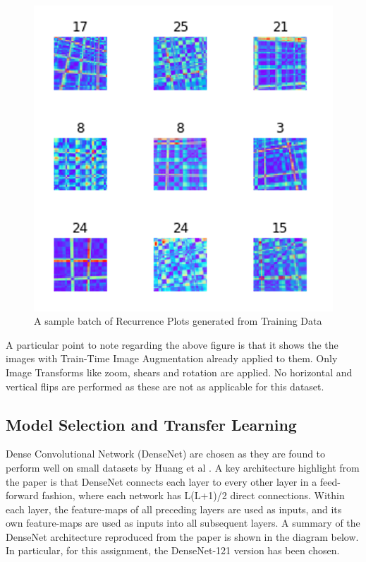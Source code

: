 \documentclass[conference]{IEEEtran}
\begin{document}
\begin{figure}[H]
\begin{center}
\includegraphics[scale=1]{Image/recurrence_plot_augmented.png}
\caption{\label{recurrence_plot_augmented} A sample batch of Recurrence Plots generated from Training Data}
\end{center}
\end{figure}

A particular point to note regarding the above figure is that it shows the the images with Train-Time Image Augmentation already applied to them. Only Image Transforms like zoom, shears and rotation are applied. No horizontal and vertical flips are performed as these are not as applicable for this dataset.

\subsection{Model Selection and Transfer Learning}
Dense Convolutional Network (DenseNet) are chosen as they are found to perform well on small datasets by Huang et al \cite{huang2016densely}. A key architecture highlight from the paper is that DenseNet connects each layer to every other layer in a feed-forward fashion, where each network has L(L+1)/2 direct connections. Within each layer, the feature-maps of all preceding layers are used as inputs, and its own feature-maps are used as inputs into all subsequent layers. A summary of the DenseNet architecture reproduced from the paper is shown in the diagram below. In particular, for this assignment, the DenseNet-121 version has been chosen.
\end{document}
